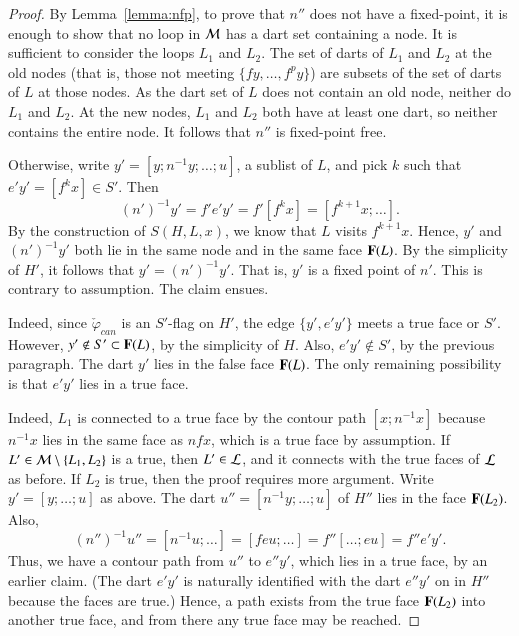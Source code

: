 \begin{proof}
 By Lemma~\ref{lemma:nfp}, to prove that $n''$
does not have a fixed-point, it is enough to show that no loop in
${\cal M}$ has a dart set containing a node.  It is sufficient to
consider the loops $L_1$ and $L_2$.  The set of darts of $L_1$ and
$L_2$ at the old nodes (that is, those not meeting $\{f y,\ldots,f^p
y\}$) are subsets of the set of darts of $L$ at those nodes.  As the
dart set of $L$ does not contain an old node, neither do $L_1$ and
$L_2$.  At the new nodes, $L_1$ and $L_2$ both have at least one dart,
so neither contains the entire node.  It follows that $n''$ is
fixed-point free.

Otherwise, write $y' = [y;n^{-1}y;\ldots;u]$, a sublist of $L$, and
pick $k$ such that $e'y' = [f^k x]\in S'$.  Then
\[ 
(n')^{-1} y' = f'e'y' = f'[f^k x] = [f^{k+1}x;\ldots].
\] 
By the construction of $S(H,L,x)$, we know that $L$ visits $f^{k+1}x$.
Hence, $y'$ and $(n')^{-1}y'$ both lie in the same node and in the same
face ${\mathbf F}(L)$.  By the simplicity of $H'$, it follows that $y' =
(n')^{-1} y'$.  That is, $y'$ is a fixed point of $n'$.  This is contrary to
assumption. The claim ensues.


  Indeed, since
$\check\varphi_{can}$ is an $S'$-flag on $H'$, the edge $\{y',e'y'\}$
meets a true face or $S'$.  However, $y'\not\in S'\subset {\mathbf F}(L)$, by
the simplicity of $H$.  Also, $e'y'\not\in S'$, by the previous
paragraph.  The dart $y'$ lies in the false face ${\mathbf F}(L)$.  The only
remaining possibility is that $e'y'$ lies in a true face.



   Indeed,
$L_1$ is connected to a true face by the contour path $[x;n^{-1} x]$
because $n^{-1} x$ lies in the same face as $n f x$, which is a true
face by assumption.  If $L'\in{\cal M}\setminus\{L_1,L_2\}$ is a true,
then $L'\in {\cal L}$, and it connects with the true faces of ${\cal
  L}$ as before.  If $L_2$ is true, then the proof requires more
argument.  Write $y'=[y;\ldots;u]$ as above.  The dart
$u''=[n^{-1}y;\ldots;u]$ of $H''$ lies in the face ${\mathbf F}(L_2)$.  Also,
\[ 
(n'')^{-1} u''= [n^{-1} u;\ldots] = [f e u;\ldots] = f'' [\ldots; e u]
  = f'' e' y'.
\] 
Thus, we have a contour path from $u''$ to $e'' y'$, which lies in a
true face, by an earlier claim.  (The dart $e'y'$ is naturally
identified with the dart $e'' y'$ on in $H''$ because the faces are
true.)  Hence, a path exists from the true face ${\mathbf F}(L_2)$ into another
true face, and from there any true face may be reached.


\end{proof}
